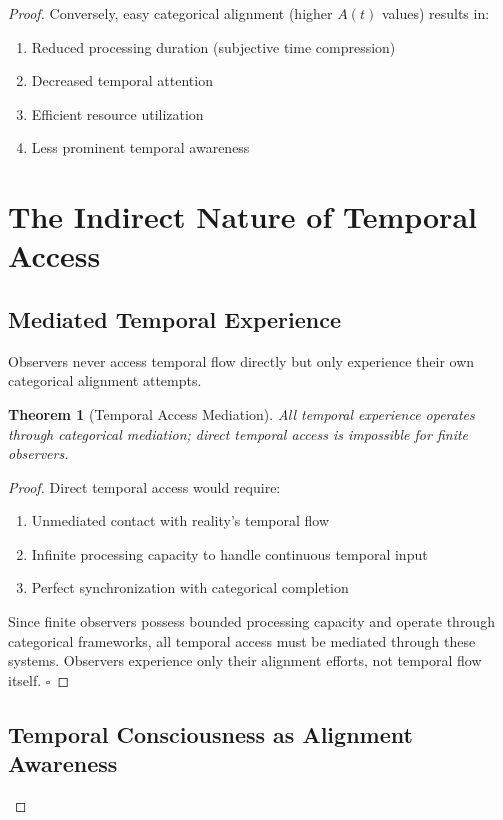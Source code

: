 \documentclass[12pt,a4paper]{article}
\newtheorem{theorem}{Theorem}
\begin{document}
\begin{proof}
Conversely, easy categorical alignment (higher $A(t)$ values) results in:
\begin{enumerate}
\item Reduced processing duration (subjective time compression)
\item Decreased temporal attention
\item Efficient resource utilization
\item Less prominent temporal awareness
\end{enumerate}

\section{The Indirect Nature of Temporal Access}

\subsection{Mediated Temporal Experience}

Observers never access temporal flow directly but only experience their own categorical alignment attempts.

\begin{theorem}[Temporal Access Mediation]
All temporal experience operates through categorical mediation; direct temporal access is impossible for finite observers.
\end{theorem}

\begin{proof}
Direct temporal access would require:
\begin{enumerate}
\item Unmediated contact with reality's temporal flow
\item Infinite processing capacity to handle continuous temporal input
\item Perfect synchronization with categorical completion
\end{enumerate}

Since finite observers possess bounded processing capacity and operate through categorical frameworks, all temporal access must be mediated through these systems. Observers experience only their alignment efforts, not temporal flow itself. $\square$
\end{proof}

\subsection{Temporal Consciousness as Alignment Awareness}


\end{proof}
\end{document}
